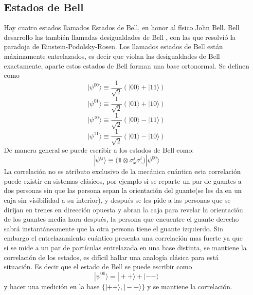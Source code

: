 \documentclass[a4paper]{article}
\begin{document}
\subsection{Estados de Bell}
Hay cuatro estados llamados Estados de Bell, en honor al físico John Bell. Bell desarrollo las también llamadas desigualdades de Bell \cite{Bell}, con las que resolvió la paradoja de Einstein-Podolsky-Rosen. Los llamados estados de Bell están máximamente entrelazados, es decir que violan las desigualdades de Bell exactamente, aparte estos estados de Bell forman una base ortonormal. Se definen como
\begin{equation}\label{eq::bell1}
|\psi^{00}\rangle\equiv \frac{1}{\sqrt{2}}(|00\rangle+|11\rangle)
\end{equation}
\begin{equation}\label{eq::bell2}
|\psi^{01}\rangle\equiv \frac{1}{\sqrt{2}}(|01\rangle+|10\rangle)
\end{equation}
\begin{equation}\label{eq::bell3}
|\psi^{10}\rangle\equiv \frac{1}{\sqrt{2}}(|00\rangle-|11\rangle)
\end{equation}
\begin{equation}\label{eq::bell4}
|\psi^{11}\rangle\equiv \frac{1}{\sqrt{2}}(|01\rangle-|10\rangle)
\end{equation}
De manera general se puede escribir a los estados de Bell como:
\begin{equation}
|\psi^{ij}\rangle\equiv \big( \mathbb{1}\otimes\sigma_x^j \sigma_z^i \big)|\psi^{00}\rangle
\end{equation}
La correlación no es atributo exclusivo de la mecánica cuántica esta correlación puede existir en sistemas clásicos, por ejemplo si se reparte un par de guantes a dos personas sin que las persona sepan la orientación del guante(se les da en un caja sin visibilidad a su interior), y después se les pide a las personas que se dirijan en trenes en dirección opuesta y abran la caja para revelar la orientación de los guantes media hora después, la persona que encuentre el guante derecho sabrá instantáneamente que la otra persona tiene el guante izquierdo. Sin embargo el entrelazamiento cuántico presenta una correlación mas fuerte ya que si se mide a un par de partículas entrelazada en una base distinta, se mantiene la correlación de los estados, es difícil hallar una analogía clásica para está situación. Es decir que el estado de Bell se puede escribir como
\begin{equation}
|\psi^{00}\rangle=|++\rangle+|--\rangle
\end{equation}
y hacer una medición en la base $\{|++\rangle,|--\rangle\}$ y se mantiene la correlación.
\end{document}
